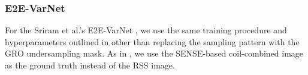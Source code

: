\documentclass{article}
\theoremstyle{plain}
\theoremstyle{definition}
\theoremstyle{remark}
\newcommand{\hvec}[1]{\ensuremath{\Hat{\boldsymbol{#1}}}}
\renewcommand{\vec}[1]{\ensuremath{\boldsymbol{#1}}}
\newcommand{\mc}[1]{\ensuremath{\mathcal{#1}}}
\DeclareMathOperator{\E}{E}
\renewcommand{\eqref}[1]{(\ref{eq:#1})}
\newcommand{\Exy}{\E_{\mathsf{x,y}}}
\newcommand{\LtwoP}{\mc{L}_{2,P}}
\newcommand{\betaadv}{\beta_{\mathsf{adv}}}
\begin{document}

\subsubsection{E2E-VarNet}

For the Sriram et al.'s E2E-VarNet \cite{Sriram:MICCAI:20}, we use the same training procedure and hyperparameters outlined in \cite{Jalal:NIPS:21} other than replacing the sampling pattern with the GRO undersampling mask.
As in \cite{Jalal:NIPS:21}, we use the SENSE-based coil-combined image as the ground truth instead of the RSS image.


\end{document}
